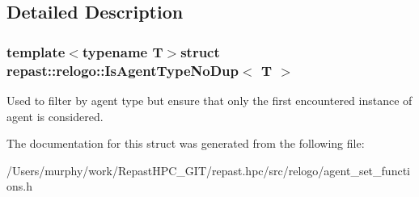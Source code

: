 \subsection{Detailed Description}
\subsubsection*{template$<$typename T$>$struct repast\-::relogo\-::\-Is\-Agent\-Type\-No\-Dup$<$ T $>$}

Used to filter by agent type but ensure that only the first encountered instance of agent is considered. 

The documentation for this struct was generated from the following file\-:\begin{DoxyCompactItemize}
\item 
/\-Users/murphy/work/\-Repast\-H\-P\-C\-\_\-\-G\-I\-T/repast.\-hpc/src/relogo/agent\-\_\-set\-\_\-functions.\-h\end{DoxyCompactItemize}
